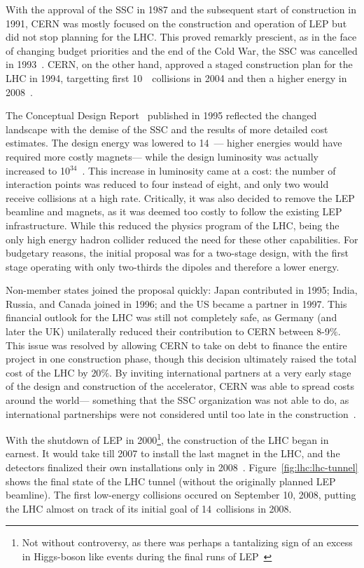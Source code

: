 
With the approval of the SSC in 1987 and the subsequent start of construction in 1991, CERN was mostly focused on the construction and operation of LEP but did not stop planning for the LHC. This proved remarkly prescient, as in the face of changing budget priorities and the end of the Cold War, the SSC was cancelled in 1993~\cite{SASSC}. CERN, on the other hand, approved a staged construction plan for the LHC in 1994, targetting first 10~\TeV~collisions in 2004 and then a higher energy in 2008~\cite{LHCWeb}.

The Conceptual Design Report~\cite{LHCCDR} published in 1995 reflected the changed landscape with the demise of the SSC and the results of more detailed cost estimates. The design energy was lowered to 14~\TeV--- higher energies would have required more costly magnets--- while the design luminosity was actually increased to 10$^{34}$~\lumirate. This increase in luminosity came at a cost: the number of interaction points was reduced to four instead of eight, and only two would receive collisions at a high rate. Critically, it was also decided to remove the LEP beamline and magnets, as it was deemed too costly to follow the existing LEP infrastructure. While this reduced the physics program of the LHC, being the only high energy hadron collider reduced the need for these other capabilities. For budgetary reasons, the initial proposal was for a two-stage design, with the first stage operating with only two-thirds the dipoles and therefore a lower energy.

Non-member states joined the proposal quickly: Japan contributed in 1995; India, Russia, and Canada joined in 1996; and the US became a partner in 1997. This financial outlook for the LHC was still not completely safe, as Germany (and later the UK) unilaterally reduced their contribution to CERN between 8-9$\%$. This issue was resolved by allowing CERN to take on debt to finance the entire project in one construction phase, though this decision ultimately raised the total cost of the LHC by $20\%$. By inviting international partners at a very early stage of the design and construction of the accelerator, CERN was able to spread costs around the world--- something that the SSC organization was not able to do, as international partnerships were not considered until too late in the construction~\cite{SASSC}.


With the shutdown of LEP in 2000\footnote{Not without controversy, as there was perhaps a tantalizing sign of an excess in Higgs-boson like events during the final runs of LEP~\cite{LEPHiggs}}, the construction of the LHC began in earnest. It would take till 2007 to install the last magnet in the LHC, and the detectors finalized their own installations only in 2008~\cite{LHCWeb}. Figure~\ref{fig:lhc:lhc-tunnel} shows the final state of the LHC tunnel (without the originally planned LEP beamline). The first low-energy collisions occured on September 10, 2008, putting the LHC almost on track of its initial goal of 14~\TeV collisions in 2008.

